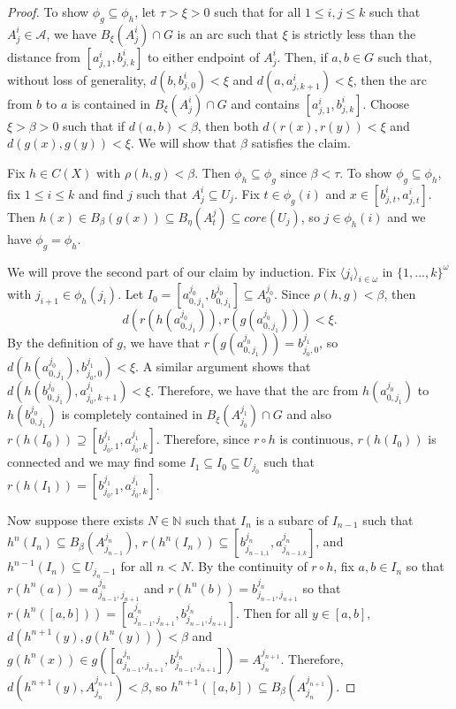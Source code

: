 \documentclass{amsart}
\numberwithin{equation}{section}
\begin{document}
\begin{proof}
To show $\phi_g\subseteq \phi_h$, let $\tau>\xi >0$ such that for all $1\leq i,j\leq k$ such that $A^i_j\in \mathcal{A}$, we have $B_\xi(A^i_j)\cap G$ is an arc such that $\xi$ is strictly less than the distance from $[a_{j,1}^i, b_{j,k}^i]$ to either endpoint of $A_j^i$. Then, if $a,b\in G$ such that, without loss of generality, $d(b, b_{j,0}^i)<\xi$ and $d(a,a_{j,k+1}^i )<\xi$, then the arc from $b$ to $a$ is contained in $B_\xi(A_j^i)\cap G$ and contains $[a_{j,1}^i, b_{j,k}^i]$. Choose $\xi>\beta>0$ such that if $d(a,b)<\beta$, then both $d(r(x),r(y))<\xi$ and $d(g(x),g(y))<\xi$. We will show that $\beta$ satisfies the claim. 

Fix $h\in C(X)$ with $\rho(h,g)<\beta$. Then $\phi_h\subseteq\phi_g$ since $\beta<\tau$. To show $\phi_g\subseteq\phi_h$, fix $1\leq i\leq k$ and find $j$ such that $A_j^i\subseteq U_j$. Fix $t\in \phi_g(i)$ and $x\in [b_{j,t}^i,a_{j,t}^i].$ Then $h(x) \in B_\beta(g(x))\subseteq B_\eta(A_t^j)\subseteq core(U_j)$, so $j\in \phi_h(i)$ and we have $\phi_g=\phi_h$.

We will prove the second part of our claim by induction. Fix $\langle j_i\rangle_{i\in \omega} $ in $\{1,...,k\}^\omega$ with $j_{i+1}\in \phi_h(j_i)$. Let $I_0= [a_{0,j_1}^{j_0}, b_{0,j_1}^{j_0}] \subseteq A_0^{j_0}.$ Since $\rho(h,g)<\beta$, then $$d(r(h(a_{0,j_1}^{j_0})), r(g(a_{0,j_1}^{j_0})))  <\xi.$$  By the definition of $g$, we have that $ r(g(a_{0,j_1}^{j_0}))=b_{j_0,0}^{j_1}$, so $d(h(a_{0,j_1}^{j_0}),b_{j_0,0}^{j_1})<\xi.$ A similar argument shows that $d(h(b_{0,j_1}^{j_0}), a^{j_1}_{j_0,k+1})<\xi.$ Therefore, we have that the arc from $h(a_{0,j_1}^{j_0})$ to $h(b_{0,j_1}^{j_0})$ is completely contained in $B_\xi (A^{j_1}_{j_0})\cap G$ and also $r(h(I_0))\supseteq [b_{j_0,1}^{j_1},a^{j_1}_{j_0,k}]$. Therefore, since $r\circ h$ is continuous, $r(h(I_0))$ is connected and we may find some $I_1\subseteq I_0\subseteq U_{j_0}$ such that $r(h(I_1))= [b_{j_0,1}^{j_1},a^{j_1}_{j_0,k}]$.

Now suppose there exists $N\in \mathbb{N}$ such that $I_n$ is a subarc of $I_{n-1}$ such that $h^n(I_n)\subseteq B_\beta(A_{j_{n-1}}^{j_n})$, $r(h^n(I_n))\subseteq [b_{j_{n-1,1}}^{j_n},a_{j_{n-1,k}}^{j_n}]$, and $h^{n-1}(I_n)\subseteq U_{j_n-1}$ for all $n<N$. By the continuity of $r\circ h$, fix $a,b\in I_n$ so that $r(h^n(a))= a^{j_n}_{j_{n-1}, j_{n+1}} $ and $r(h^n(b))= b^{j_n}_{j_{n-1}, j_{n+1}} $ so that $r(h^n([a,b]))= [a^{j_n}_{j_{n-1}, j_{n+1}} ,b^{j_n}_{j_{n-1}, j_{n+1}} ]$. Then for all $y\in [a,b] $, $d(h^{n+1}(y),g(h^n(y)))<\beta$ and $g(h^n(x))\in g([a^{j_n}_{j_{n-1}, j_{n+1}} ,b^{j_n}_{j_{n-1}, j_{n+1}} ])= A^{j_{n+1}}_{j_n}.$ Therefore, $d(h^{n+1}(y),A^{j_{n+1}}_{j_{n}})<\beta $, so $h^{n+1}([a,b])\subseteq B_\beta(A^{j_{n+1}}_{j_n}).$


\end{proof}
\end{document}
